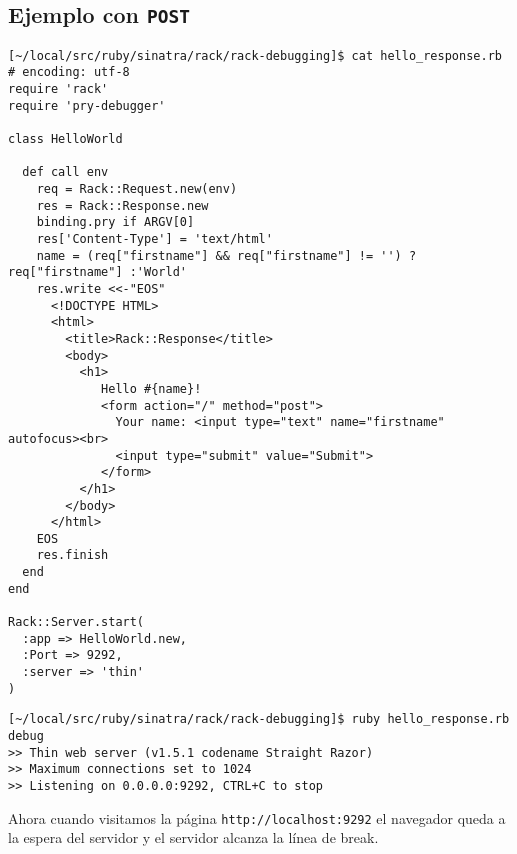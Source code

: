 \subsection{Ejemplo con {\tt POST}}
\begin{verbatim}
[~/local/src/ruby/sinatra/rack/rack-debugging]$ cat hello_response.rb 
# encoding: utf-8
require 'rack'
require 'pry-debugger'

class HelloWorld

  def call env
    req = Rack::Request.new(env)
    res = Rack::Response.new 
    binding.pry if ARGV[0]
    res['Content-Type'] = 'text/html'
    name = (req["firstname"] && req["firstname"] != '') ? req["firstname"] :'World'
    res.write <<-"EOS"
      <!DOCTYPE HTML>
      <html>
        <title>Rack::Response</title>
        <body>
          <h1>
             Hello #{name}!
             <form action="/" method="post">
               Your name: <input type="text" name="firstname" autofocus><br>
               <input type="submit" value="Submit">
             </form>
          </h1>
        </body>
      </html>
    EOS
    res.finish
  end
end

Rack::Server.start(
  :app => HelloWorld.new,
  :Port => 9292,
  :server => 'thin'
)
\end{verbatim}

\begin{verbatim}
[~/local/src/ruby/sinatra/rack/rack-debugging]$ ruby hello_response.rb debug
>> Thin web server (v1.5.1 codename Straight Razor)
>> Maximum connections set to 1024
>> Listening on 0.0.0.0:9292, CTRL+C to stop
\end{verbatim}

Ahora cuando visitamos la página \verb|http://localhost:9292| el navegador queda a la
espera del servidor y el servidor alcanza la línea de break.

